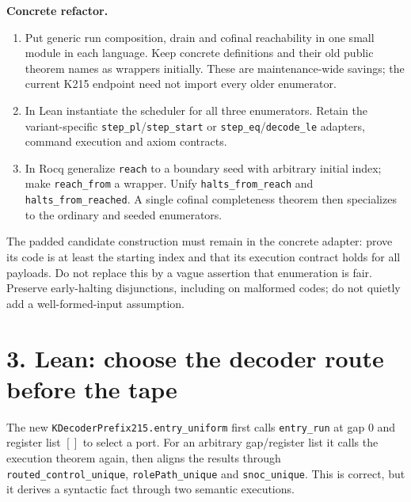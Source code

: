 \documentclass[10pt]{article}
\newcommand{\code}[1]{\texttt{#1}}
\begin{document}
\textbf{Concrete refactor.}
\begin{enumerate}[leftmargin=*,nosep]
\item Put generic run composition, drain and cofinal reachability in one small module in each language. Keep concrete definitions and their old public theorem names as wrappers initially. These are maintenance-wide savings; the current K215 endpoint need not import every older enumerator.
\item In Lean instantiate the scheduler for all three enumerators. Retain the variant-specific \code{step\_pl}/\code{step\_start} or \code{step\_eq}/\code{decode\_le} adapters, command execution and axiom contracts.
\item In Rocq generalize \code{reach} to a boundary seed with arbitrary initial index; make \code{reach\_from} a wrapper. Unify \code{halts\_from\_reach} and \code{halts\_from\_reached}. A single cofinal completeness theorem then specializes to the ordinary and seeded enumerators.
\end{enumerate}
The padded candidate construction must remain in the concrete adapter: prove its code is at least the starting index and that its execution contract holds for all payloads. Do not replace this by a vague assertion that enumeration is fair. Preserve early-halting disjunctions, including on malformed codes; do not quietly add a well-formed-input assumption.

\section*{3. Lean: choose the decoder route before the tape}
The new \code{KDecoderPrefix215.entry\_uniform} first calls \code{entry\_run} at gap $0$ and register list $[]$ to select a port. For an arbitrary gap/register list it calls the execution theorem again, then aligns the results through \code{routed\_control\_unique}, \code{rolePath\_unique} and \code{snoc\_unique}. This is correct, but it derives a syntactic fact through two semantic executions.
\end{document}
